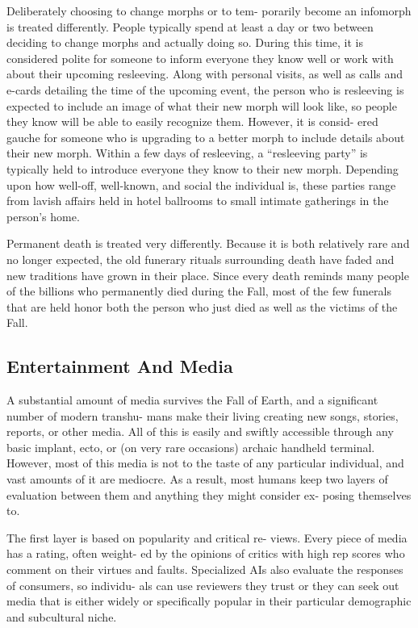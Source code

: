 Deliberately choosing to change morphs or to tem-
porarily become an infomorph is treated differently. 
People typically spend at least a day or two between 
deciding to change morphs and actually doing so. 
During this time, it is considered polite for someone 
to inform everyone they know well or work with 
about their upcoming resleeving. Along with personal 
visits, as well as calls and e-cards detailing the time 
of the upcoming event, the person who is resleeving 
is expected to include an image of what their new 
morph will look like, so people they know will be 
able to easily recognize them. However, it is consid-
ered gauche for someone who is upgrading to a better 
morph to include details about their new morph. 
Within a few days of resleeving, a ``resleeving party'' 
is typically held to introduce everyone they know 
to their new morph. Depending upon how well-off, 
well-known, and social the individual is, these parties 
range from lavish affairs held in hotel ballrooms to 
small intimate gatherings in the person's home.

Permanent death is treated very differently. Because 
it is both relatively rare and no longer expected, the 
old funerary rituals surrounding death have faded 
and new traditions have grown in their place. Since 
every death reminds many people of the billions who 
permanently died during the Fall, most of the few 
funerals that are held honor both the person who just 
died as well as the victims of the Fall.

\subsection{Entertainment And Media}

A substantial amount of media survives the Fall of 
Earth, and a significant number of modern transhu-
mans make their living creating new songs, stories, 
reports, or other media. All of this is easily and swiftly 
accessible through any basic implant, ecto, or (on very 
rare occasions) archaic handheld terminal. However, 
most of this media is not to the taste of any particular 
individual, and vast amounts of it are mediocre. As 
a result, most humans keep two layers of evaluation 
between them and anything they might consider ex-
posing themselves to.

The first layer is based on popularity and critical re-
views. Every piece of media has a rating, often weight-
ed by the opinions of critics with high rep scores who 
comment on their virtues and faults. Specialized AIs 
also evaluate the responses of consumers, so individu-
als can use reviewers they trust or they can seek out 
media that is either widely or specifically popular in 
their particular demographic and subcultural niche.

